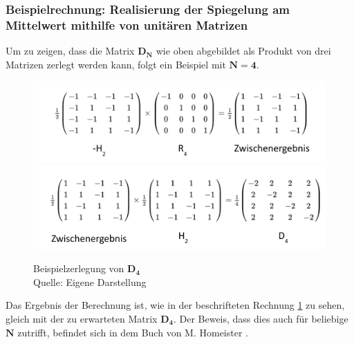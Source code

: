 \subsubsection{Beispielrechnung: Realisierung der Spiegelung am Mittelwert  mithilfe von unitären Matrizen}
Um zu zeigen, dass die Matrix $\mathbf{D_N}$ wie oben abgebildet als Produkt von drei Matrizen zerlegt werden kann, folgt ein Beispiel mit $\mathbf{N = 4}$.
\begin{figure}[hbtp]
	\centering
	\includegraphics[width=.8\textwidth]{figures/householderLokal_1.png}
	\includegraphics[width=.8\textwidth]{figures/householderLokal_2.png}
	\caption{Beispielzerlegung von $\mathbf{D_4}$ \\ Quelle: Eigene Darstellung}
	\label{fig:DLokal}
\end{figure}
Das Ergebnis der Berechnung ist, wie in der beschrifteten Rechnung \ref{fig:DLokal} zu sehen, gleich mit der zu erwarteten Matrix $\mathbf{D_4}$. Der Beweis, dass dies auch für beliebige $\mathbf{N}$ zutrifft, befindet sich in dem Buch von M. Homeister \cite[S. 309]{Ho17}.

